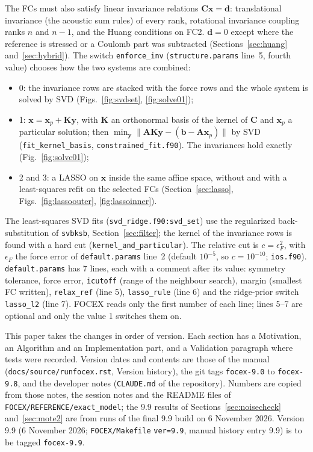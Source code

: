 \documentclass[11pt,a4paper]{article}
\newcommand{\bA}{\mathbf A}
\newcommand{\bC}{\mathbf C}
\newcommand{\bK}{\mathbf K}
\newcommand{\bx}{\mathbf x}
\newcommand{\by}{\mathbf y}
\newcommand{\bb}{\mathbf b}
\newcommand{\bd}{\mathbf d}
\newcommand{\code}[1]{\texttt{#1}}
\begin{document}
The FCs must also satisfy linear invariance relations $\bC\bx=\bd$: translational invariance (the
acoustic sum rules) of every rank, rotational invariance coupling ranks $n$ and $n-1$, and the Huang
conditions on FC2. $\bd=0$ except where the reference is stressed or a Coulomb part was subtracted
(Sections~\ref{sec:huang} and~\ref{sec:hybrid}). The switch \code{enforce\_inv} (\code{structure.params}
line~5, fourth value) chooses how the two systems are combined:
\begin{itemize}
\item 0: the invariance rows are stacked with the force rows and the whole system is solved by SVD
(Figs.~\ref{fig:svdset}, \ref{fig:solve01});
\item 1: $\bx=\bx_p+\bK\by$, with $\bK$ an orthonormal basis of the kernel of $\bC$ and $\bx_p$ a
particular solution; then $\min_\by\|\bA\bK\by-(\bb-\bA\bx_p)\|$ by SVD (\code{fit\_kernel\_basis},
\code{constrained\_fit.f90}). The invariances hold exactly (Fig.~\ref{fig:solve01});
\item 2 and 3: a LASSO on $\bx$ inside the same affine space, without and with a least-squares refit on
the selected FCs (Section~\ref{sec:lasso}, Figs.~\ref{fig:lassoouter}, \ref{fig:lassoinner}).
\end{itemize}
The least-squares SVD fits (\code{svd\_ridge.f90:svd\_set}) use the regularized back-substitution of \code{svbksb},
Section~\ref{sec:filter}; the kernel of the invariance rows is found with a hard cut
(\code{kernel\_and\_particular}). The relative cut is $c=\epsilon_F^2$, with $\epsilon_F$ the force error of
\code{default.params} line~2 (default $10^{-5}$, so $c=10^{-10}$; \code{ios.f90}).
\code{default.params} has 7 lines, each with a comment after its value: symmetry tolerance, force error,
\code{icutoff} (range of the neighbour search), margin (smallest FC written), \code{relax\_ref} (line 5),
\code{lasso\_rule} (line 6) and the ridge-prior switch \code{lasso\_l2} (line 7). FOCEX reads only the first
number of each line; lines 5--7 are optional and only the value 1 switches them on.

This paper takes the changes in order of version. Each section has a Motivation, an Algorithm and an
Implementation part, and a Validation paragraph where tests were recorded. Version dates and contents are
those of the manual (\code{docs/source/runfocex.rst}, Version history), the git tags \code{focex-9.0} to
\code{focex-9.8}, and the developer notes (\code{CLAUDE.md} of the repository). Numbers are copied from
those notes, the session notes and the README files of \code{FOCEX/REFERENCE/exact\_model}; the 9.9
results of Sections~\ref{sec:noisecheck} and~\ref{sec:mote2} are from runs of the final 9.9 build on
6 November 2026. Version 9.9 (6 November 2026; \code{FOCEX/Makefile} \code{ver=9.9}, manual history entry
9.9) is to be tagged \code{focex-9.9}.
\end{document}
